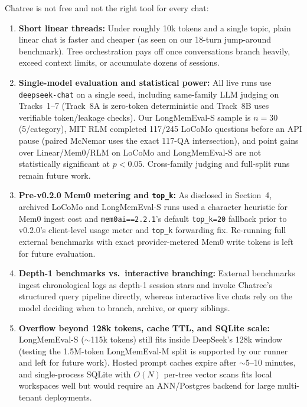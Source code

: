 \documentclass[10pt,twocolumn]{article}
\begin{document}
Chatree is not free and not the right tool for every chat:
\begin{enumerate}
  \item \textbf{Short linear threads:} Under roughly 10k tokens and a single topic, plain linear chat is faster and cheaper (as seen on our 18-turn jump-around benchmark). Tree orchestration pays off once conversations branch heavily, exceed context limits, or accumulate dozens of sessions.
  \item \textbf{Single-model evaluation and statistical power:} All live runs use \texttt{deepseek-chat} on a single seed, including same-family LLM judging on Tracks~1--7 (Track~8A is zero-token deterministic and Track~8B uses verifiable token/leakage checks). Our LongMemEval-S sample is $n=30$ (5/category), MIT RLM completed 117/245 LoCoMo questions before an API pause (paired McNemar uses the exact 117-QA intersection), and point gains over Linear/Mem0/RLM on LoCoMo and LongMemEval-S are not statistically significant at $p<0.05$. Cross-family judging and full-split runs remain future work.
  \item \textbf{Pre-v0.2.0 Mem0 metering and \texttt{top\_k}:} As disclosed in Section~4, archived LoCoMo and LongMemEval-S runs used a character heuristic for Mem0 ingest cost and \texttt{mem0ai==2.2.1}'s default \texttt{top\_k=20} fallback prior to v0.2.0's client-level usage meter and \texttt{top\_k} forwarding fix. Re-running full external benchmarks with exact provider-metered Mem0 write tokens is left for future evaluation.
  \item \textbf{Depth-1 benchmarks vs.\ interactive branching:} External benchmarks ingest chronological logs as depth-1 session stars and invoke Chatree's structured query pipeline directly, whereas interactive live chats rely on the model deciding when to branch, archive, or query siblings.
  \item \textbf{Overflow beyond 128k tokens, cache TTL, and SQLite scale:} LongMemEval-S ($\sim$115k tokens) still fits inside DeepSeek's 128k window (testing the 1.5M-token LongMemEval-M split is supported by our runner and left for future work). Hosted prompt caches expire after $\sim$5--10 minutes, and single-process SQLite with $O(N)$ per-tree vector scans fits local workspaces well but would require an ANN/Postgres backend for large multi-tenant deployments.
\end{enumerate}

\end{document}
